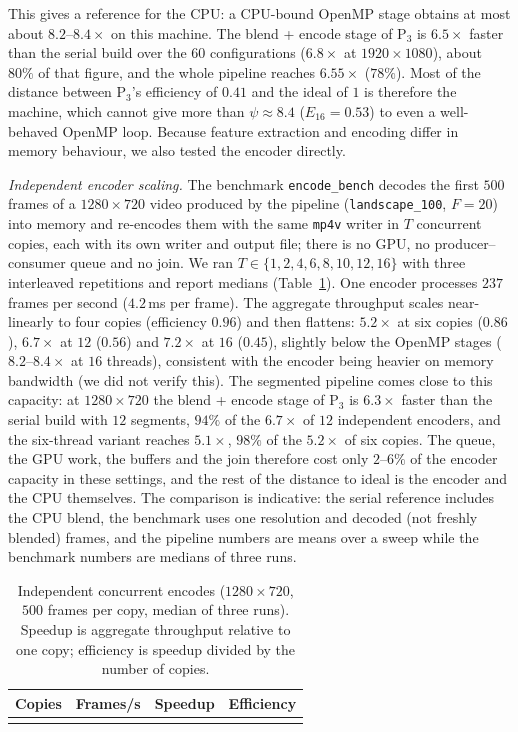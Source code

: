 \documentclass[conference]{IEEEtran}
\begin{document}
This gives a reference for the CPU: a CPU-bound OpenMP stage obtains at most about $8.2$--$8.4\times$ on this machine. The blend + encode stage of P$_3$ is $6.5\times$ faster than the serial build over the $60$ configurations ($6.8\times$ at $1920\times1080$), about $80\%$ of that figure, and the whole pipeline reaches $6.55\times$ ($78\%$). Most of the distance between P$_3$'s efficiency of $0.41$ and the ideal of $1$ is therefore the machine, which cannot give more than $\psi\approx8.4$ ($E_{16}=0.53$) to even a well-behaved OpenMP loop. Because feature extraction and encoding differ in memory behaviour, we also tested the encoder directly.

\emph{Independent encoder scaling.} The benchmark \texttt{encode\_bench} decodes the first $500$ frames of a $1280\times720$ video produced by the pipeline (\texttt{landscape\_100}, $F{=}20$) into memory and re-encodes them with the same \texttt{mp4v} writer in $T$ concurrent copies, each with its own writer and output file; there is no GPU, no producer--consumer queue and no join. We ran $T\in\{1,2,4,6,8,10,12,16\}$ with three interleaved repetitions and report medians (Table~\ref{tab:encoder}). One encoder processes $237$ frames per second ($4.2$\,ms per frame). The aggregate throughput scales near-linearly to four copies (efficiency $0.96$) and then flattens: $5.2\times$ at six copies ($0.86$), $6.7\times$ at $12$ ($0.56$) and $7.2\times$ at $16$ ($0.45$), slightly below the OpenMP stages ($8.2$--$8.4\times$ at $16$ threads), consistent with the encoder being heavier on memory bandwidth (we did not verify this). The segmented pipeline comes close to this capacity: at $1280\times720$ the blend + encode stage of P$_3$ is $6.3\times$ faster than the serial build with $12$ segments, $94\%$ of the $6.7\times$ of $12$ independent encoders, and the six-thread variant reaches $5.1\times$, $98\%$ of the $5.2\times$ of six copies. The queue, the GPU work, the buffers and the join therefore cost only $2$--$6\%$ of the encoder capacity in these settings, and the rest of the distance to ideal is the encoder and the CPU themselves. The comparison is indicative: the serial reference includes the CPU blend, the benchmark uses one resolution and decoded (not freshly blended) frames, and the pipeline numbers are means over a sweep while the benchmark numbers are medians of three runs.

\begin{table}[t]
\caption{Independent concurrent encodes ($1280\times720$, $500$ frames per copy, median of three runs). Speedup is aggregate throughput relative to one copy; efficiency is speedup divided by the number of copies.}
\label{tab:encoder}
\centering
\footnotesize
\setlength{\tabcolsep}{6pt}
\begin{tabular}{@{}rrrr@{}}
\toprule
Copies & Frames/s & Speedup & Efficiency \\
\midrule
\\
\bottomrule
\end{tabular}
\end{table}
\end{document}
